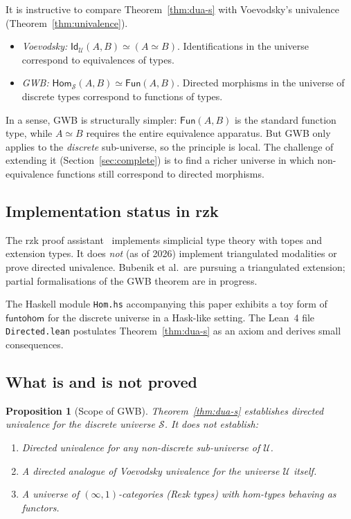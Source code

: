 \documentclass[12pt]{article}
\newtheorem{proposition}[theorem]{Proposition}
\theoremstyle{definition}
\theoremstyle{remark}
\newcommand{\U}{\mathcal{U}}
\newcommand{\Hom}{\mathsf{Hom}}
\newcommand{\Fun}{\mathsf{Fun}}
\newcommand{\Id}{\mathsf{Id}}
\newcommand{\funtohom}{\mathsf{funtohom}}
\newcommand{\eqv}{\simeq}
\begin{document}
It is instructive to compare Theorem~\ref{thm:dua-s} with Voevodsky's univalence (Theorem~\ref{thm:univalence}).

\begin{itemize}
\item \emph{Voevodsky:} $\Id_{\U}(A,B) \eqv (A \eqv B)$. Identifications in the universe correspond to equivalences of types.
\item \emph{GWB:} $\Hom_{\mathcal{S}}(A,B) \eqv \Fun(A,B)$. Directed morphisms in the universe of discrete types correspond to functions of types.
\end{itemize}

In a sense, GWB is structurally simpler: $\Fun(A,B)$ is the standard function type, while $A \eqv B$ requires the entire equivalence apparatus. But GWB only applies to the \emph{discrete} sub-universe, so the principle is local. The challenge of extending it (Section~\ref{sec:complete}) is to find a richer universe in which non-equivalence functions still correspond to directed morphisms.

\subsection{Implementation status in rzk}

The rzk proof assistant~\cite{rzk} implements simplicial type theory with topes and extension types. It does \emph{not} (as of 2026) implement triangulated modalities or prove directed univalence. Bubenik et al.\ are pursuing a triangulated extension; partial formalisations of the GWB theorem are in progress.

The Haskell module \texttt{Hom.hs} accompanying this paper exhibits a toy form of $\funtohom$ for the discrete universe in a Hask-like setting. The Lean~4 file \texttt{Directed.lean} postulates Theorem~\ref{thm:dua-s} as an axiom and derives small consequences.

\subsection{What is and is not proved}

\begin{proposition}[Scope of GWB]\label{prop:scope-gwb}
Theorem~\ref{thm:dua-s} establishes directed univalence for the discrete universe $\mathcal{S}$. It does \emph{not} establish:
\begin{enumerate}
\item Directed univalence for any non-discrete sub-universe of $\U$.
\item A directed analogue of Voevodsky univalence for the universe $\U$ itself.
\item A universe of $(\infty,1)$-categories (Rezk types) with hom-types behaving as functors.
\end{enumerate}
\end{proposition}
\end{document}
